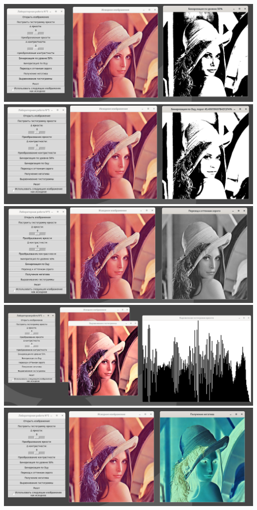 \documentclass[a4paper,12pt]{article}
\begin{document}
\begin{flushleft}
  \includegraphics[scale=1]{binarysation_50.jpg}
  \includegraphics[scale=1]{binarysation_otsu.jpg}
  \includegraphics[scale=1]{grayscale.jpg}
  \includegraphics[scale=0.8]{hist_equal.jpg}
  \includegraphics[scale=1]{negative.jpg}
\end{flushleft}
\end{document}
